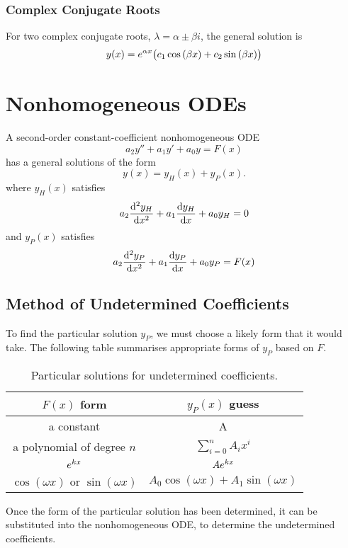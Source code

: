 \documentclass{article}
\begin{document}
\subsubsection{Complex Conjugate Roots}
For two complex conjugate roots, $\lambda = \alpha \pm \beta i$, the general solution is
\begin{equation*}
    y(x) = e^{\alpha x}\bigl( c_1\cos{\left( \beta x \right)} + c_2 \sin{\left( \beta x \right)} \bigr)
\end{equation*}
\section{Nonhomogeneous ODEs}
A second-order constant-coefficient nonhomogeneous ODE
\begin{equation*}
    a_2y'' + a_1y' + a_0y = F(x)
\end{equation*}
has a general solutions of the form
\begin{equation*}
    y(x) = y_H(x) + y_P(x).
\end{equation*}
where $y_H(x)$ satisfies
\begin{equation*}
    a_2\dv[2]{y_H}{x} + a_1\dv{y_H}{x} + a_0y_H = 0
\end{equation*}
and $y_P(x)$ satisfies
\begin{equation*}
    a_2\dv[2]{y_P}{x} + a_1\dv{y_P}{x} + a_0y_P = F(x)
\end{equation*}
\subsection{Method of Undetermined Coefficients}
To find the particular solution $y_P$, we must choose a likely
form that it would take. The following table summarises appropriate
forms of $y_P$ based on $F$.
\begin{table}[H]
    \centering
    \begin{tabular}{c | c}
        \toprule
        $F(x)$ form & $y_P(x)$ guess \\
        \midrule
        a constant & A \\
        a polynomial of degree $n$ & $\displaystyle \sum_{i = 0}^n A_i x^i$ \\
        $e^{kx}$ & $A e^{kx}$ \\
        $\cos{\left( \omega x \right)}$ or $\sin{\left( \omega x \right)}$ & $A_0 \cos{\left( \omega x \right)} + A_1 \sin{\left( \omega x \right)}$ \\
        \bottomrule
    \end{tabular}
    \caption{Particular solutions for undetermined coefficients.}
\end{table}
Once the form of the particular solution has been determined, it can be substituted into the 
nonhomogeneous ODE, to determine the undetermined coefficients.
\end{document}
